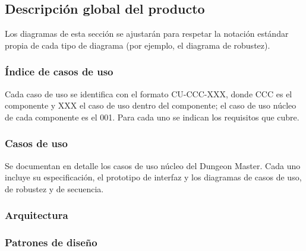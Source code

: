 \subsection{Descripción global del producto}
Los diagramas de esta sección se ajustarán para respetar la notación estándar propia de cada tipo de diagrama (por ejemplo, el diagrama de robustez).


\subsubsection{Índice de casos de uso}
Cada caso de uso se identifica con el formato CU-CCC-XXX, donde CCC es el componente y XXX el caso de uso dentro del componente; el caso de uso núcleo de cada componente es el 001. Para cada uno se indican los requisitos que cubre.


\subsubsection{Casos de uso}
Se documentan en detalle los casos de uso núcleo del Dungeon Master. Cada uno incluye su especificación, el prototipo de interfaz y los diagramas de casos de uso, de robustez y de secuencia.


\iftfi



\fi

\subsubsection{Arquitectura}


\subsubsection{Patrones de diseño}



